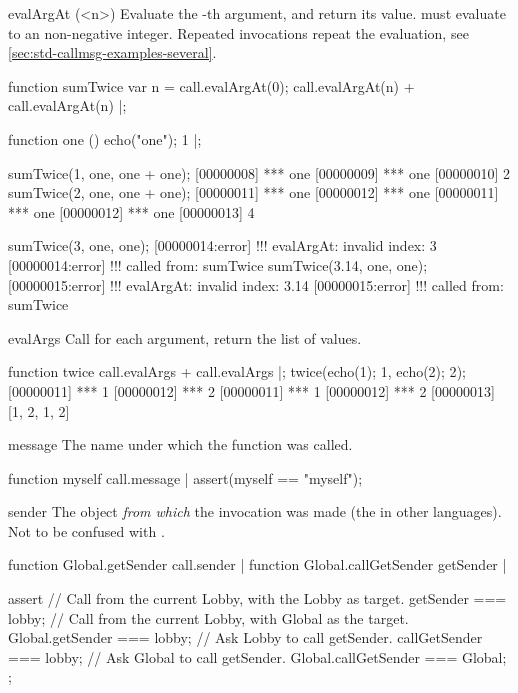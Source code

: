 \begin{urbiscriptapi}
\item[evalArgAt](<n>)%
  Evaluate the -th argument, and return its value.  
  must evaluate to an non-negative integer.  Repeated invocations
  repeat the evaluation, see
  \autoref{sec:std-callmsg-examples-several}.
\begin{urbiscript}
function sumTwice
{
  var n = call.evalArgAt(0);
  call.evalArgAt(n) + call.evalArgAt(n)
}|;

function one () { echo("one"); 1 }|;

sumTwice(1, one, one + one);
[00000008] *** one
[00000009] *** one
[00000010] 2
sumTwice(2, one, one + one);
[00000011] *** one
[00000012] *** one
[00000011] *** one
[00000012] *** one
[00000013] 4

sumTwice(3, one, one);
[00000014:error] !!! evalArgAt: invalid index: 3
[00000014:error] !!!    called from: sumTwice
sumTwice(3.14, one, one);
[00000015:error] !!! evalArgAt: invalid index: 3.14
[00000015:error] !!!    called from: sumTwice
\end{urbiscript}


\item[evalArgs]%
  Call  for each argument, return the list of values.
\begin{urbiscript}
function twice
{
  call.evalArgs + call.evalArgs
}|;
twice({echo(1); 1}, {echo(2); 2});
[00000011] *** 1
[00000012] *** 2
[00000011] *** 1
[00000012] *** 2
[00000013] [1, 2, 1, 2]
\end{urbiscript}


\item[message]
  The name under which the function was called.
\begin{urbiscript}
function myself { call.message }|
assert(myself == "myself");
\end{urbiscript}


\item[sender]%
  The object \emph{from which} the invocation was made (the  in
  other languages).  Not to be confused with .
\begin{urbiscript}
function Global.getSender { call.sender } |
function Global.callGetSender { getSender } |

assert
{
  // Call from the current Lobby, with the Lobby as target.
  getSender === lobby;
  // Call from the current Lobby, with Global as the target.
  Global.getSender === lobby;
  // Ask Lobby to call getSender.
  callGetSender === lobby;
  // Ask Global to call getSender.
  Global.callGetSender === Global;
};
\end{urbiscript}



\end{urbiscriptapi}
